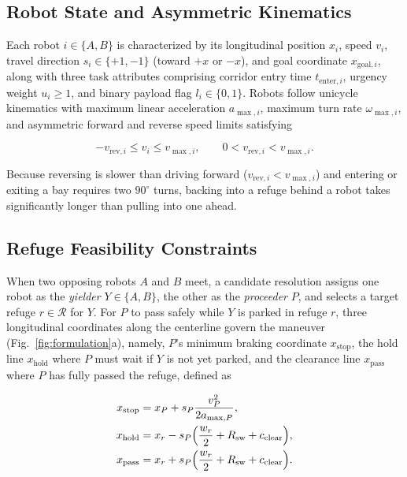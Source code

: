 \subsection{Robot State and Asymmetric Kinematics}
Each robot $i \in \{A, B\}$ is characterized by its longitudinal position $x_i$, speed $v_i$, travel direction $s_i \in \{+1, -1\}$ (toward $+x$ or $-x$), and goal coordinate $x_{\mathrm{goal},i}$, along with three task attributes comprising corridor entry time $t_{\mathrm{enter},i}$, urgency weight $u_i \ge 1$, and binary payload flag $l_i \in \{0, 1\}$.
Robots follow unicycle kinematics with maximum linear acceleration $a_{\max,i}$, maximum turn rate $\omega_{\max,i}$, and asymmetric forward and reverse speed limits satisfying

\begin{equation}
-v_{\mathrm{rev},i} \le v_i \le v_{\max,i}, \qquad 0 < v_{\mathrm{rev},i} < v_{\max,i}.
\label{eq:speed_bounds}
\end{equation}

Because reversing is slower than driving forward ($v_{\mathrm{rev},i} < v_{\max,i}$) and entering or exiting a bay requires two $90^\circ$ turns, backing into a refuge behind a robot takes significantly longer than pulling into one ahead.

\subsection{Refuge Feasibility Constraints}
When two opposing robots $A$ and $B$ meet, a candidate resolution assigns one robot as the \emph{yielder} $Y \in \{A, B\}$, the other as the \emph{proceeder} $P$, and selects a target refuge $r \in \mathcal{R}$ for $Y$.
For $P$ to pass safely while $Y$ is parked in refuge $r$, three longitudinal coordinates along the centerline govern the maneuver (Fig.~\ref{fig:formulation}a), namely, $P$'s minimum braking coordinate $x_{\mathrm{stop}}$, the hold line $x_{\mathrm{hold}}$ where $P$ must wait if $Y$ is not yet parked, and the clearance line $x_{\mathrm{pass}}$ where $P$ has fully passed the refuge, defined as

\begin{equation}
\begin{aligned}
x_{\mathrm{stop}} &= x_P + s_P \frac{v_P^2}{2 a_{\max,P}}, \\
x_{\mathrm{hold}} &= x_r - s_P \Bigl(\frac{w_r}{2} + R_{\mathrm{sw}} + c_{\mathrm{clear}}\Bigr), \\
x_{\mathrm{pass}} &= x_r + s_P \Bigl(\frac{w_r}{2} + R_{\mathrm{sw}} + c_{\mathrm{clear}}\Bigr).
\end{aligned}
\label{eq:geom}
\end{equation}

